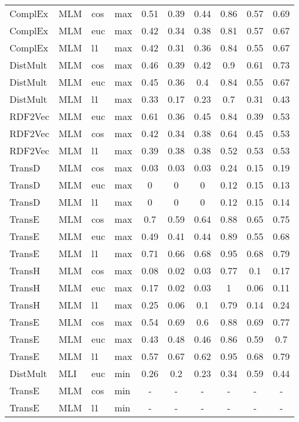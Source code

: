 \begin{longtable}{|llll|ccc|ccc|}
ComplEx	&	MLM	&	cos	&	max	&	0.51	&	0.39	&	0.44	&	0.86	&	0.57	&	0.69 \\ 
ComplEx	&	MLM	&	euc	&	max	&	0.42	&	0.34	&	0.38	&	0.81	&	0.57	&	0.67 \\ 
ComplEx	&	MLM	&	l1	&	max	&	0.42	&	0.31	&	0.36	&	0.84	&	0.55	&	0.67 \\ 
DistMult	&	MLM	&	cos	&	max	&	0.46	&	0.39	&	0.42	&	0.9	&	0.61	&	0.73 \\ 
DistMult	&	MLM	&	euc	&	max	&	0.45	&	0.36	&	0.4	&	0.84	&	0.55	&	0.67 \\ 
DistMult	&	MLM	&	l1	&	max	&	0.33	&	0.17	&	0.23	&	0.7	&	0.31	&	0.43 \\ 
RDF2Vec	&	MLM	&	euc	&	max	&	0.61	&	0.36	&	0.45	&	0.84	&	0.39	&	0.53 \\ 
RDF2Vec	&	MLM	&	cos	&	max	&	0.42	&	0.34	&	0.38	&	0.64	&	0.45	&	0.53 \\ 
RDF2Vec	&	MLM	&	l1	&	max	&	0.39	&	0.38	&	0.38	&	0.52	&	0.53	&	0.53 \\ 
TransD	&	MLM	&	cos	&	max	&	0.03	&	0.03	&	0.03	&	0.24	&	0.15	&	0.19 \\ 
TransD	&	MLM	&	euc	&	max	&	0	&	0	&	0	&	0.12	&	0.15	&	0.13 \\ 
TransD	&	MLM	&	l1	&	max	&	0	&	0	&	0	&	0.12	&	0.15	&	0.14 \\ 
TransE	&	MLM	&	cos	&	max	&	0.7	&	0.59	&	0.64	&	0.88	&	0.65	&	0.75 \\ 
TransE	&	MLM	&	euc	&	max	&	0.49	&	0.41	&	0.44	&	0.89	&	0.55	&	0.68 \\ 
TransE	&	MLM	&	l1	&	max	&	0.71	&	0.66	&	0.68	&	0.95	&	0.68	&	0.79 \\ 
TransH	&	MLM	&	cos	&	max	&	0.08	&	0.02	&	0.03	&	0.77	&	0.1	&	0.17 \\ 
TransH	&	MLM	&	euc	&	max	&	0.17	&	0.02	&	0.03	&	1	&	0.06	&	0.11 \\ 
TransH	&	MLM	&	l1	&	max	&	0.25	&	0.06	&	0.1	&	0.79	&	0.14	&	0.24 \\ 
TransE	&	MLM	&	cos	&	max	&	0.54	&	0.69	&	0.6	&	0.88	&	0.69	&	0.77 \\ 
TransE	&	MLM	&	euc	&	max	&	0.43	&	0.48	&	0.46	&	0.86	&	0.59	&	0.7 \\ 
TransE	&	MLM	&	l1	&	max	&	0.57	&	0.67	&	0.62	&	0.95	&	0.68	&	0.79 \\ 
DistMult	&	MLI	&	euc	&	min	&	0.26	&	0.2	&	0.23	&	0.34	&	0.59	&	0.44 \\ 
TransE	&	MLM	&	cos	&	min	&	-	&	-	&	-	&	-	&	-	&	- \\ 
TransE	&	MLM	&	l1	&	min	&	-	&	-	&	-	&	-	&	-	&	- \\ 

\end{longtable}
